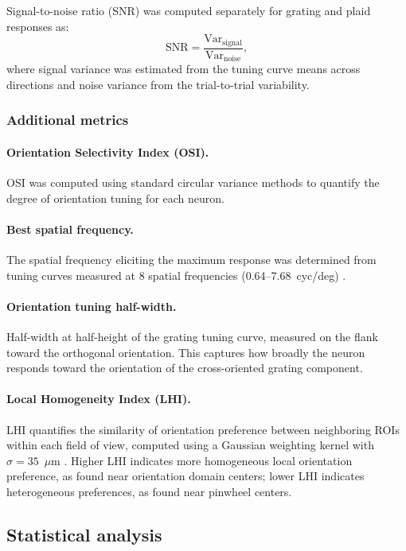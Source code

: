 \documentclass[11pt,letterpaper]{article}
\begin{document}
Signal-to-noise ratio (SNR) was computed separately for grating and plaid
responses as:
\begin{equation}
  \text{SNR} = \frac{\text{Var}_{\text{signal}}}{\text{Var}_{\text{noise}}},
\end{equation}
where signal variance was estimated from the tuning curve means across
directions and noise variance from the trial-to-trial variability.

\subsubsection{Additional metrics}

\paragraph{Orientation Selectivity Index (OSI).}
OSI was computed using standard circular variance methods \citep{ringach2002}
to quantify the degree of orientation tuning for each neuron.

\paragraph{Best spatial frequency.}
The spatial frequency eliciting the maximum response was determined from
tuning curves measured at 8 spatial frequencies (0.64--7.68~cyc/deg)
\citep{devries1982}.

\paragraph{Orientation tuning half-width.}
Half-width at half-height of the grating tuning curve, measured on the
flank toward the orthogonal orientation. This captures how broadly the
neuron responds toward the orientation of the cross-oriented grating
component.

\paragraph{Local Homogeneity Index (LHI).}
LHI quantifies the similarity of orientation preference between neighboring
ROIs within each field of view, computed using a Gaussian weighting kernel
with $\sigma = 35$~$\mu$m \citep{nauhaus2008}. Higher LHI indicates more
homogeneous local orientation preference, as found near orientation domain
centers; lower LHI indicates heterogeneous preferences, as found near pinwheel
centers.

\subsection{Statistical analysis}
\end{document}
